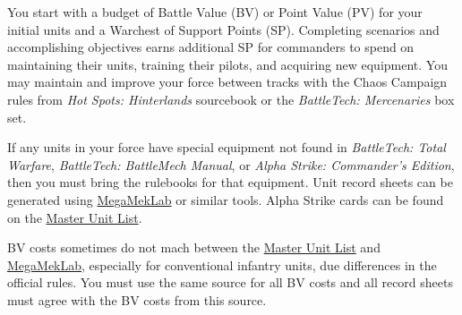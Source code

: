You start with a budget of Battle Value (BV) or Point Value (PV) for your initial units and a Warchest of Support Points (SP).
Completing scenarios and accomplishing objectives earns additional SP for commanders to spend on maintaining their units, training their pilots, and acquiring new equipment.
You may maintain and improve your force between tracks with the Chaos Campaign rules from \emph{Hot Spots: Hinterlands} sourcebook or the \emph{BattleTech: Mercenaries} box set.

If any units in your force have special equipment not found in \emph{BattleTech: Total Warfare}, \emph{BattleTech: BattleMech Manual}, or \emph{Alpha Strike: Commander's Edition}, then you must bring the rulebooks for that equipment.
Unit record sheets can be generated using \href{https://megamek.org}{MegaMekLab} or similar tools.
Alpha Strike cards can be found on the \href{http://www.masterunitlist.info}{Master Unit List}.

BV costs sometimes do not mach between the \href{http://www.masterunitlist.info}{Master Unit List} and \href{https://megamek.org}{MegaMekLab}, especially for conventional infantry units, due differences in the official rules.
You must use the same source for all BV costs and all record sheets must agree with the BV costs from this source.
